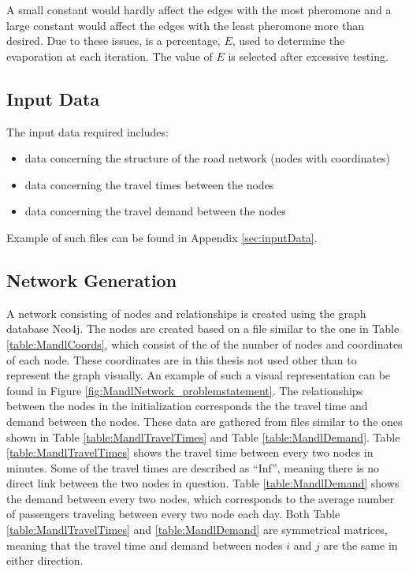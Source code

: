 A small constant would hardly affect the edges with the most pheromone and a large constant would affect the edges with the least pheromone more than desired. Due to these issues, is a percentage, $E$, used to determine the evaporation at each iteration. The value of $E$ is selected after excessive testing.

\subsection{Input Data}
The input data required includes:
\begin{itemize}
\item data concerning the structure of the road network (nodes with coordinates)
\item data concerning the travel times between the nodes
\item data concerning the travel demand between the nodes
\end{itemize}
Example of such files can be found in Appendix \vref{sec:inputData}.

\subsection{Network Generation}
\label{subsec:networkGeneration}

A network consisting of nodes and relationships is created using the graph database Neo4j. The nodes are created based on a file similar to the one in Table \vref{table:MandlCoords}, which consist of the of the number of nodes and coordinates of each node. These coordinates are in this thesis not used other than to represent the graph visually. An example of such a visual representation can be found in Figure \vref{fig:MandlNetwork_problemstatement}. The relationships between the nodes in the initialization corresponds the the travel time and demand between the nodes. These data are gathered from files similar to the ones shown in Table 
\vref{table:MandlTravelTimes} and Table \vref{table:MandlDemand}. Table \ref{table:MandlTravelTimes} shows the travel time between every two nodes in minutes. Some of the travel times are described as ``Inf'', meaning there is no direct link between the two nodes in question. Table \ref{table:MandlDemand} shows the demand between every two nodes, which corresponds to the average number of passengers traveling between every two node each day. Both Table \ref{table:MandlTravelTimes} and \ref{table:MandlDemand} are symmetrical matrices, meaning that the travel time and demand between nodes $i$ and $j$ are the same in either direction. 

